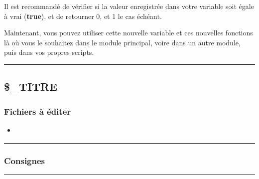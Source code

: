 \documentclass[a4paper,10pt]{article}
\begin{document}
    \begin{justify}
    Il est recommandé de vérifier si la valeur enregistrée dans votre variable soit égale à vrai (\textbf{true}), et de retourner 0, et 1 le cas échéant.
    \end{justify}

    \begin{justify}
        Maintenant, vous pouvez utiliser cette nouvelle variable et ces nouvelles fonctions là où vous le souhaitez dans le module principal, voire dans un autre module, puis dans vos propres scripts.
    \end{justify}




    \color{sec2}\par\noindent\rule{\textwidth}{0.4pt}\color{text}

    \color{sec2}
    \subsection{\$\_TITRE}\color{text}

    \color{sec3}
    \subsubsection{Fichiers à éditer}\color{text}

    \begin{itemize}
        \item \textbf{\color{path}\color{text}}
    \end{itemize}



    \color{sec3}\par\noindent\rule{\textwidth}{0.4pt}\color{text}

    \color{sec3}
    \subsubsection{Consignes}\color{text}




    \color{sec2}\par\noindent\rule{\textwidth}{0.4pt}\color{text}
\end{document}
